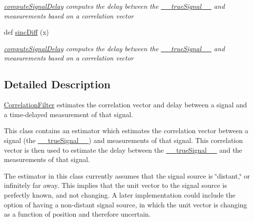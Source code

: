 \begin{DoxyCompactItemize}
\begin{DoxyCompactList}\small\item\em \hyperlink{classSignalCorrelationSubstate_1_1CorrelationFilter_ace04b6e310f321192715c76ec2ac6b52}{compute\+Signal\+Delay} computes the delay between the \hyperlink{classSignalCorrelationSubstate_1_1CorrelationFilter_a5f777d3a877658a1365ebac65b9ab25b}{\+\_\+\+\_\+true\+Signal\+\_\+\+\_\+} and measurements based on a correlation vector \end{DoxyCompactList}\item 
def \hyperlink{classSignalCorrelationSubstate_1_1CorrelationFilter_a948d71970965e18ecc2f19c3bc49f7f7}{sinc\+Diff} (x)
\begin{DoxyCompactList}\small\item\em \hyperlink{classSignalCorrelationSubstate_1_1CorrelationFilter_ace04b6e310f321192715c76ec2ac6b52}{compute\+Signal\+Delay} computes the delay between the \hyperlink{classSignalCorrelationSubstate_1_1CorrelationFilter_a5f777d3a877658a1365ebac65b9ab25b}{\+\_\+\+\_\+true\+Signal\+\_\+\+\_\+} and measurements based on a correlation vector \end{DoxyCompactList}\end{DoxyCompactItemize}


\subsection{Detailed Description}
\hyperlink{classSignalCorrelationSubstate_1_1CorrelationFilter}{Correlation\+Filter} estimates the correlation vector and delay between a signal and a time-\/delayed measurement of that signal. 

This class contains an estimator which estimates the correlation vector between a signal (the \hyperlink{classSignalCorrelationSubstate_1_1CorrelationFilter_a5f777d3a877658a1365ebac65b9ab25b}{\+\_\+\+\_\+true\+Signal\+\_\+\+\_\+}) and measurements of that signal. This correlation vector is then used to estimate the delay between the \hyperlink{classSignalCorrelationSubstate_1_1CorrelationFilter_a5f777d3a877658a1365ebac65b9ab25b}{\+\_\+\+\_\+true\+Signal\+\_\+\+\_\+} and the measurements of that signal.

The estimator in this class currently assumes that the signal source is \char`\"{}distant,\char`\"{} or infinitely far away. This implies that the unit vector to the signal source is perfectly known, and not changing. A later implementation could include the option of having a non-\/distant signal source, in which the unit vector is changing as a function of position and therefore uncertain.

